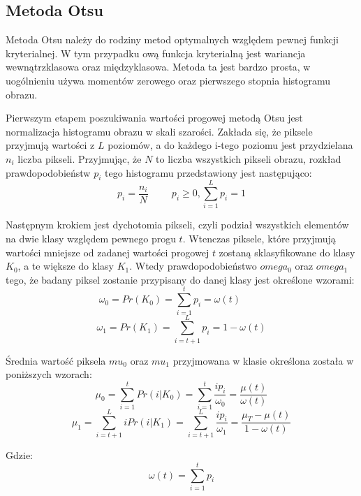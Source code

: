 \documentclass[eng,oneside]{mgr}
\begin{document}
\subsection{Metoda Otsu}
Metoda Otsu należy do rodziny metod optymalnych względem pewnej funkcji kryterialnej. W tym przypadku ową funkcja kryterialną jest wariancja wewnątrzklasowa oraz międzyklasowa. Metoda ta jest bardzo prosta, w uogólnieniu używa momentów zerowego oraz pierwszego stopnia histogramu obrazu.
\par Pierwszym etapem poszukiwania wartości progowej metodą Otsu jest normalizacja histogramu obrazu w skali szarości. Zakłada się, że piksele przyjmują wartości z $L$ poziomów, a do każdego i-tego poziomu jest przydzielana $n_i$ liczba pikseli. Przyjmując, że $N$ to liczba wszystkich pikseli obrazu, rozkład prawdopodobieństw $p_i$ tego histogramu przedstawiony jest następująco:
\begin{equation}
 p_i = \frac{n_i}{N} \hspace{1cm}
 p_i \geq 0, \sum_{i=1}^L p_i = 1 
\end{equation}
\par Następnym krokiem jest dychotomia pikseli, czyli podział wszystkich elementów na dwie klasy względem pewnego progu $t$. Wtenczas piksele, które przyjmują wartości mniejsze od zadanej wartości progowej $t$ zostaną sklasyfikowane do klasy $K_0$, a te większe do klasy $K_1$. Wtedy prawdopodobieństwo $omega_0$ oraz $omega_1$ tego, że badany piksel zostanie przypisany do danej klasy jest określone wzorami:
\begin{equation}
\omega_0 = Pr(K_0)=\sum_{i=1}^t p_i = \omega(t)\hspace{1cm}
\end{equation}
\begin{equation}
\omega_1 = Pr(K_1)=\sum_{i=t+1}^L p_i = 1 - \omega(t)
\end{equation}
\par Średnia wartość piksela $mu_0$ oraz $mu_1$ przyjmowana w klasie określona została w poniższych wzorach:
\begin{equation}
\mu_0=\sum_{i=1}^t Pr(i|K_0)=\sum_{i=1}^t \frac{ip_i}{\omega_0}=\frac{\mu(t)}{\omega(t)}
\end{equation}
\begin{equation}
\mu_1=\sum_{i=t+1}^L iPr(i|K_1)=\sum_{i=t+1}^L \frac{ip_i}{\omega_1} = \frac{\mu_T-\mu(t)}{1-\omega(t)}
\end{equation}
\par Gdzie:
\begin{equation}
\omega(t)=\sum_{i=1}^t p_i
\end{equation}
\end{document}
